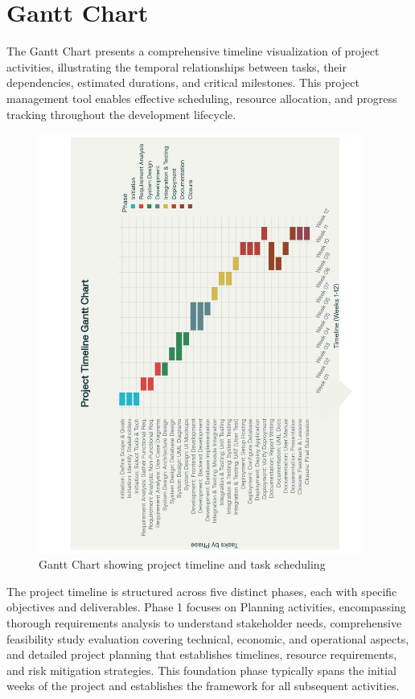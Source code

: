 \section{Gantt Chart}

The Gantt Chart presents a comprehensive timeline visualization of project activities, illustrating the temporal relationships between tasks, their dependencies, estimated durations, and critical milestones. This project management tool enables effective scheduling, resource allocation, and progress tracking throughout the development lifecycle.

\begin{figure}[htbp]
    \centering
    \includegraphics[width=0.95\textwidth]{images/Gantt Chart.jpg}
    \caption{Gantt Chart showing project timeline and task scheduling}
    \label{fig:gantt}
\end{figure}

The project timeline is structured across five distinct phases, each with specific objectives and deliverables. Phase 1 focuses on Planning activities, encompassing thorough requirements analysis to understand stakeholder needs, comprehensive feasibility study evaluation covering technical, economic, and operational aspects, and detailed project planning that establishes timelines, resource requirements, and risk mitigation strategies. This foundation phase typically spans the initial weeks of the project and establishes the framework for all subsequent activities.

